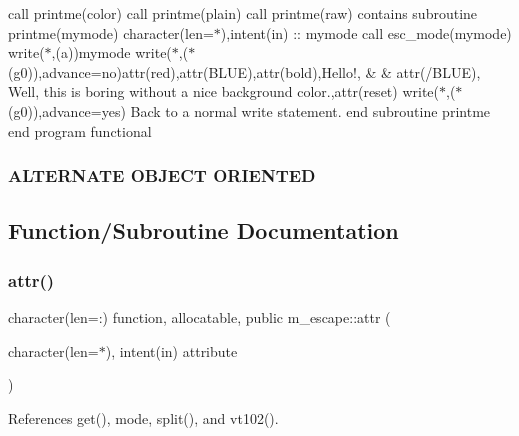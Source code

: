 call printme(\textquotesingle{}color\textquotesingle{}) call printme(\textquotesingle{}plain\textquotesingle{}) call printme(\textquotesingle{}raw\textquotesingle{}) contains subroutine printme(mymode) character(len=$\ast$),intent(in) \+:\+: mymode call esc\+\_\+mode(mymode) write($\ast$,\textquotesingle{}(a)\textquotesingle{})mymode write($\ast$,\textquotesingle{}($\ast$(g0))\textquotesingle{},advance=\textquotesingle{}no\textquotesingle{})attr(\textquotesingle{}red\textquotesingle{}),attr(\textquotesingle{}B\+L\+UE\textquotesingle{}),attr(\textquotesingle{}bold\textquotesingle{}),\textquotesingle{}Hello!\textquotesingle{}, \& \& attr(\textquotesingle{}/\+B\+L\+UE\textquotesingle{}),\textquotesingle{} Well, this is boring without a nice background color.\textquotesingle{},attr(\textquotesingle{}reset\textquotesingle{}) write($\ast$,\textquotesingle{}($\ast$(g0))\textquotesingle{},advance=\textquotesingle{}yes\textquotesingle{})\textquotesingle{} Back to a normal write statement.\textquotesingle{} end subroutine printme end program functional

\subsubsection*{A\+L\+T\+E\+R\+N\+A\+TE O\+B\+J\+E\+CT O\+R\+I\+E\+N\+T\+ED}

\subsection{Function/\+Subroutine Documentation}
\mbox{\label{namespacem__escape_ab9ee8dee0ee167567e9c2f570f398987}} 
\subsubsection{\texorpdfstring{attr()}{attr()}}
{\footnotesize\ttfamily character(len=\+:) function, allocatable, public m\+\_\+escape\+::attr (\begin{DoxyParamCaption}\item[{character(len=$\ast$), intent(in)}]{attribute }\end{DoxyParamCaption})}



References get(), mode, split(), and vt102().

